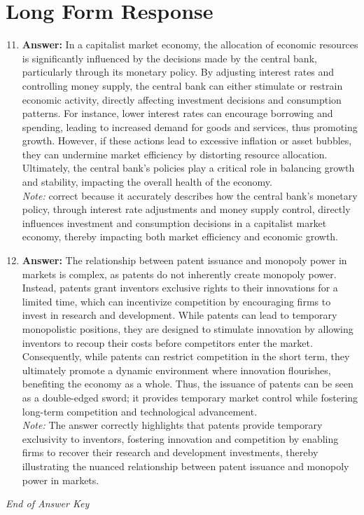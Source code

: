 \documentclass[12pt]{article}
\begin{document}
\section*{Long Form Response}
\begin{enumerate}[label=\arabic*.]
\setcounter{enumi}{10}
\item \textbf{Answer:} In a capitalist market economy, the allocation of economic resources is significantly influenced by the decisions made by the central bank, particularly through its monetary policy. By adjusting interest rates and controlling money supply, the central bank can either stimulate or restrain economic activity, directly affecting investment decisions and consumption patterns. For instance, lower interest rates can encourage borrowing and spending, leading to increased demand for goods and services, thus promoting growth. However, if these actions lead to excessive inflation or asset bubbles, they can undermine market efficiency by distorting resource allocation. Ultimately, the central bank's policies play a critical role in balancing growth and stability, impacting the overall health of the economy.
\\ \textit{Note:} correct because it accurately describes how the central bank's monetary policy, through interest rate adjustments and money supply control, directly influences investment and consumption decisions in a capitalist market economy, thereby impacting both market efficiency and economic growth.
\item \textbf{Answer:} The relationship between patent issuance and monopoly power in markets is complex, as patents do not inherently create monopoly power. Instead, patents grant inventors exclusive rights to their innovations for a limited time, which can incentivize competition by encouraging firms to invest in research and development. While patents can lead to temporary monopolistic positions, they are designed to stimulate innovation by allowing inventors to recoup their costs before competitors enter the market. Consequently, while patents can restrict competition in the short term, they ultimately promote a dynamic environment where innovation flourishes, benefiting the economy as a whole. Thus, the issuance of patents can be seen as a double-edged sword; it provides temporary market control while fostering long-term competition and technological advancement.
\\ \textit{Note:} The answer correctly highlights that patents provide temporary exclusivity to inventors, fostering innovation and competition by enabling firms to recover their research and development investments, thereby illustrating the nuanced relationship between patent issuance and monopoly power in markets.
\end{enumerate}

\vfill
\noindent\textit{End of Answer Key}
\end{document}
